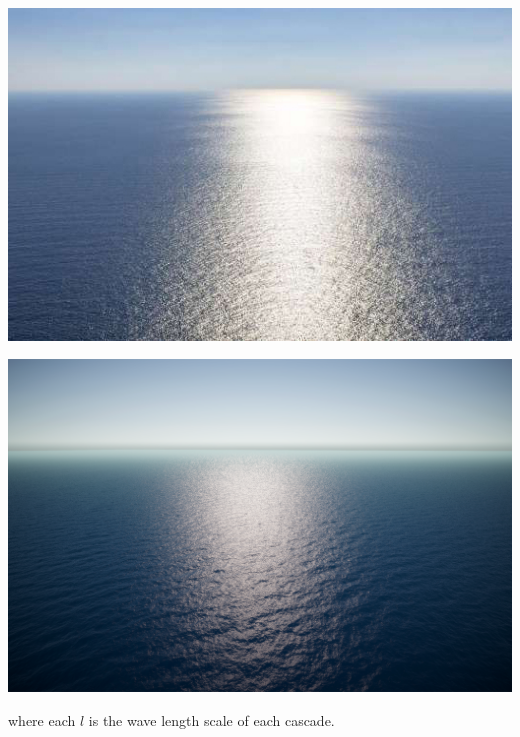 \begin{minipage}[t]{0.48\textwidth}
    \centering
    \includegraphics[width=1\textwidth]{"images/real_calm_ocean.jpg"}
    \captionsetup{justification=centering}
    \label{fig:real_calm_ocean}
\end{minipage}
\hfill
\begin{minipage}[t]{0.48\textwidth}
    \centering
    \includegraphics[width=1\textwidth]{"images/fake_calm_ocean.png"}
    \label{fig:fake_calm_ocean}
\end{minipage}

where each $l$ is the wave length scale of each cascade.

